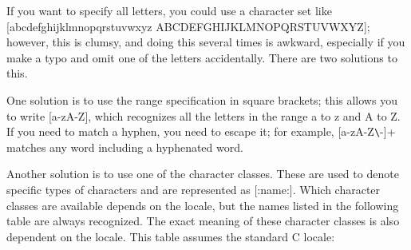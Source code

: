 If you want to specify all letters, you could use a character set like [abcdefghijklmnopqrstuvwxyz ABCDEFGHIJKLMNOPQRSTUVWXYZ]; however, this is clumsy, and doing this several times is awkward, especially if you make a typo and omit one of the letters accidentally. There are two solutions to this.

One solution is to use the range specification in square brackets; this allows you to write [a-zA-Z], which recognizes all the letters in the range a to z and A to Z. If you need to match a hyphen, you need to escape it; for example, [a-zA-Z\verb|\|-]+ matches any word including a hyphenated word.

Another solution is to use one of the character classes. These are used to denote specific types of characters and are represented as [:name:]. Which character classes are available depends on the locale, but the names listed in the following table are always recognized. The exact meaning of these character classes is also dependent on the locale. This table assumes the standard C locale:


